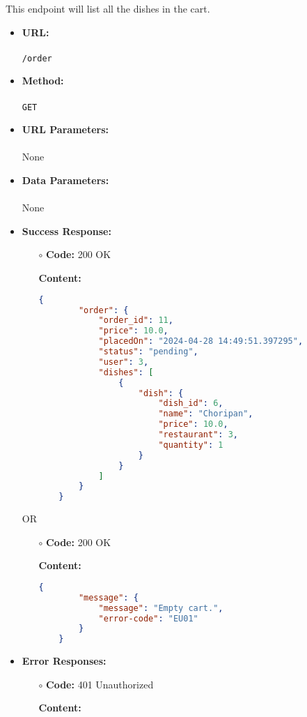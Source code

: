 

This endpoint will list all the dishes in the cart.

\begin{itemize}
    \item \textbf{URL:} \\\\\texttt{/order}
    \item \textbf{Method:} \\\\\texttt{GET}
    \item \textbf{URL Parameters:} \\\\None
    \item \textbf{Data Parameters:}\\\\None
    \item \textbf{Success Response:}
		\begin{itemize}
			\item[$\circ$] \textbf{Code:} 200 OK
			\item[] \textbf{Content:}
			\medskip
			\begin{lstlisting}[language=json]
	{
		"order": {
			"order_id": 11,
			"price": 10.0,
			"placedOn": "2024-04-28 14:49:51.397295",
			"status": "pending",
			"user": 3,
			"dishes": [
				{
					"dish": {
						"dish_id": 6,
						"name": "Choripan",
						"price": 10.0,
						"restaurant": 3,
						"quantity": 1
					}
				}
			]
		}
	}
			\end{lstlisting}
		\end{itemize}
	OR
	\begin{itemize}
		\item[$\circ$] \textbf{Code:} 200 OK
		\item[] \textbf{Content:}
		\medskip
		\begin{lstlisting}[language=json]
	{
		"message": {
			"message": "Empty cart.",
			"error-code": "EU01"
		}
	}
		\end{lstlisting}
	\end{itemize}
	   \item \textbf{Error Responses:}
    	\begin{itemize}
			\item[$\circ$] \textbf{Code:} 401 Unauthorized
			\item[] \textbf{Content:}
			\begin{lstlisting}[language=json]

\end{lstlisting}
\end{itemize}
\end{itemize}

